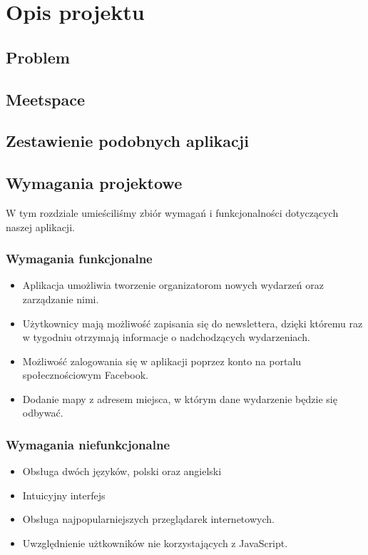 \section{Opis projektu}
\subsection{Problem}
\subsection{Meetspace}
\subsection{Zestawienie podobnych aplikacji}


\subsection{Wymagania projektowe}
W tym rozdziale umieściliśmy zbiór wymagań i funkcjonalności dotyczących naszej aplikacji.
  \subsubsection{Wymagania funkcjonalne}
    \begin{itemize}
      \item Aplikacja umożliwia tworzenie organizatorom nowych wydarzeń oraz zarządzanie nimi.
      \item Użytkownicy mają możliwość zapisania się do newslettera, dzięki któremu raz w tygodniu otrzymają informacje o nadchodzących wydarzeniach.
      \item Możliwość zalogowania się w aplikacji poprzez konto na portalu społecznościowym Facebook.
      \item Dodanie mapy z adresem miejsca, w którym dane wydarzenie będzie się odbywać.
    \end{itemize}
  \subsubsection{Wymagania niefunkcjonalne}
    \begin{itemize}
      \item Obsługa dwóch języków, polski oraz angielski
      \item Intuicyjny interfejs
      \item Obsługa najpopularniejszych przeglądarek internetowych.
      \item Uwzględnienie użtkowników nie korzystających z JavaScript.
    \end{itemize}

